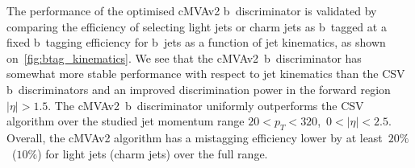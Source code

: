 The performance of the optimised cMVAv2 b~discriminator is validated by comparing the efficiency of selecting light jets or charm jets as b~tagged at a fixed b~tagging efficiency for b~jets as a function of jet kinematics, as shown on~\cref{fig:btag_kinematics}. We see that the cMVAv2~b~discriminator has somewhat more stable performance with respect to jet kinematics than the CSV b~discriminators and an improved discrimination power in the forward region $|\eta| > 1.5$. The cMVAv2~b~discriminator uniformly outperforms the CSV algorithm over the studied jet momentum range $20 < p_T < 320$,~$0 < |\eta| < 2.5$. Overall, the cMVAv2 algorithm has a mistagging efficiency lower by at least~$20\%$~($10\%$) for light jets (charm jets) over the full range.

\begin{figure}
\begin{centering}
 \\

\end{centering}
\end{figure}
